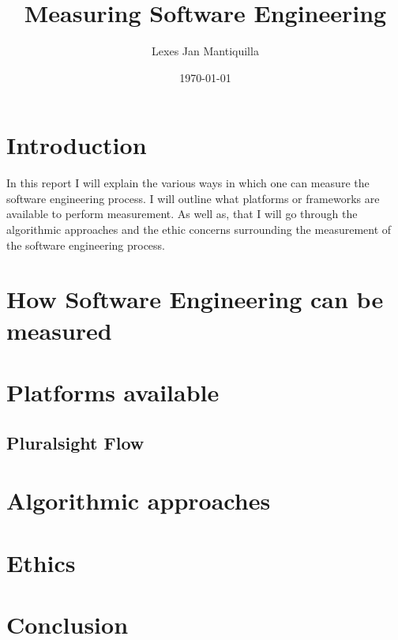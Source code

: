 \documentclass{article}
\title{Measuring Software Engineering}
\author{Lexes Jan Mantiquilla}
\date{\today}
\begin{document}
\maketitle
\tableofcontents
\newpage

\section{Introduction}
In this report I will explain the various ways in which one can measure the
software engineering process. I will outline what platforms or frameworks are
available to perform measurement. As well as, that I will go through the
algorithmic approaches and the ethic concerns surrounding the measurement of
the software engineering process.

\section{How Software Engineering can be measured}
\section{Platforms available}
\subsection{Pluralsight Flow}

\section{Algorithmic approaches}
\section{Ethics}
\section{Conclusion}



\end{document}
